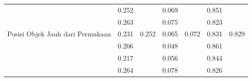 \begin{table}[]
\begin{tabular}{|l|cc|cc|cc|}
                                                      & \multicolumn{1}{c|}{\cellcolor[HTML]{FFFFFF}0.252} & \cellcolor[HTML]{FFFFFF}                         & \multicolumn{1}{c|}{\cellcolor[HTML]{FFFFFF}0.069} & \cellcolor[HTML]{FFFFFF}                           & \multicolumn{1}{c|}{\cellcolor[HTML]{FFFFFF}0.851} & \cellcolor[HTML]{FFFFFF}                        \\ \cline{2-2} \cline{4-4} \cline{6-6}
                                                      & \multicolumn{1}{c|}{\cellcolor[HTML]{FFFFFF}0.263} & \cellcolor[HTML]{FFFFFF}                         & \multicolumn{1}{c|}{\cellcolor[HTML]{FFFFFF}0.075} & \cellcolor[HTML]{FFFFFF}                           & \multicolumn{1}{c|}{\cellcolor[HTML]{FFFFFF}0.823} & \cellcolor[HTML]{FFFFFF}                        \\ \cline{2-2} \cline{4-4} \cline{6-6}
  \multirow{-5}{*}{Posisi Objek Jauh dari Permukaan}                & \multicolumn{1}{c|}{\cellcolor[HTML]{FFFFFF}0.231} & \multirow{-5}{*}{\cellcolor[HTML]{FFFFFF}0.252} & \multicolumn{1}{c|}{\cellcolor[HTML]{FFFFFF}0.065} & \multirow{-5}{*}{\cellcolor[HTML]{FFFFFF}0.072} & \multicolumn{1}{c|}{\cellcolor[HTML]{FFFFFF}0.831} & \multirow{-5}{*}{\cellcolor[HTML]{FFFFFF}0.829} \\ \hline
                                                      & \multicolumn{1}{c|}{\cellcolor[HTML]{FFFFFF}0.206} & \cellcolor[HTML]{FFFFFF}                         & \multicolumn{1}{c|}{\cellcolor[HTML]{FFFFFF}0.048} & \cellcolor[HTML]{FFFFFF}                           & \multicolumn{1}{c|}{\cellcolor[HTML]{FFFFFF}0.861} & \cellcolor[HTML]{FFFFFF}                        \\ \cline{2-2} \cline{4-4} \cline{6-6}
                                                      & \multicolumn{1}{c|}{\cellcolor[HTML]{FFFFFF}0.217} & \cellcolor[HTML]{FFFFFF}                         & \multicolumn{1}{c|}{\cellcolor[HTML]{FFFFFF}0.056}  & \cellcolor[HTML]{FFFFFF}                           & \multicolumn{1}{c|}{\cellcolor[HTML]{FFFFFF}0.844} & \cellcolor[HTML]{FFFFFF}                        \\ \cline{2-2} \cline{4-4} \cline{6-6}
                                                      & \multicolumn{1}{c|}{\cellcolor[HTML]{FFFFFF}0.264} & \cellcolor[HTML]{FFFFFF}                         & \multicolumn{1}{c|}{\cellcolor[HTML]{FFFFFF}0.078} & \cellcolor[HTML]{FFFFFF}                           & \multicolumn{1}{c|}{\cellcolor[HTML]{FFFFFF}0.826} & \cellcolor[HTML]{FFFFFF}                        \\ \cline{2-2} \cline{4-4} \cline{6-6}

\end{tabular}
\end{table}
